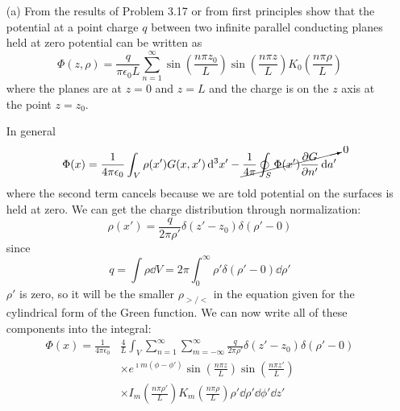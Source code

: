 \documentclass[a4paper,twoside]{article}
\begin{document}
\hr
\begin{itemize}
    \item[(a)] From the results of Problem 3.17 or from first principles show that the potential at a point charge $ q $ between two infinite parallel conducting planes held at zero potential can be written as
        \begin{equation}
            \Phi(z, \rho) = \frac{q}{\pi \epsilon_0 L} \sum_{n=1}^{\infty} \sin \left( \frac{n \pi z_0}{L} \right) \sin \left( \frac{n \pi z}{L} \right) K_0 \left( \frac{n \pi \rho}{L} \right)
        \end{equation}
        where the planes are at $ z = 0 $ and $ z = L $ and the charge is on the $ z $ axis at the point $ z = z_0 $.
        \begin{tcolorbox}[breakable]
            In general
            \begin{equation}
                \Phi(x) = \frac{1}{4 \pi \epsilon_0} \int_{V} \rho(x') G(x,x') \dd[3]{x'} - \cancelto{0}{\frac{1}{4 \pi} \oint_S \Phi(x') \pdv{G}{n'}\dd{a'}}
            \end{equation}
            where the second term cancels because we are told potential on the surfaces is held at zero. We can get the charge distribution through normalization:
            \begin{equation}
                \rho(x') = \frac{q}{2 \pi \rho'}\delta(z'-z_0)\delta(\rho'-0)
            \end{equation}
            since
            \begin{equation}
                q = \int \rho \dd{V} = 2\pi \int_0^{\infty} \rho'\delta(\rho'-0) \dd{\rho'}
            \end{equation}
            $ \rho' $ is zero, so it will be the smaller $ \rho_{>/<} $ in the equation given for the cylindrical form of the Green function. We can now write all of these components into the integral:
            \begin{equation}
                \begin{split}
                \Phi(x) = \frac{1}{4 \pi \epsilon_0}& \frac{4}{L} \int_V \sum_{n=1}^{\infty} \sum_{m=- \infty}^{\infty} \frac{q}{2 \pi \rho'}\delta(z'-z_0)\delta(\rho'-0)\\&\times e^{\imath m(\phi-\phi')} \sin \left( \frac{n \pi z}{L} \right) \sin \left( \frac{n \pi z'}{L} \right)\\ &\times I_m \left( \frac{n \pi \rho'}{L} \right) K_m \left( \frac{n \pi \rho}{L} \right) \rho'\dd{\rho'}\dd{\phi'}\dd{z'} 
            \end{split}

\end{equation}
\end{tcolorbox}
\end{itemize}
\end{document}
